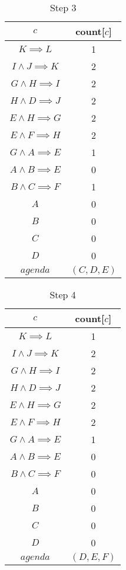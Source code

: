 \documentclass[12pt]{article}
\begin{document}
\begin{itemize}
\begin{table}[H]
\centering
\caption*{Step 3}
\label{my-label1}
\begin{tabular}{ c c }
\hline
$c$ & count[$c$]\\ \hline
$K \implies L$ & 1\\
$I \land J \implies K$ & 2\\
$G \land H \implies I$ & 2\\
$H \land D \implies J$ & 2\\
$E \land H \implies G$ & 2\\
$E \land F \implies H$ & 2\\
$G \land A \implies E$ & 1\\
$A \land B \implies E$ & 0\\
$B \land C \implies F$ & 1\\
$A$ & 0\\
$B$ & 0\\
$C$ & 0\\
$D$ & 0\\ \hline
$agenda$ & $(C, D, E)$
\end{tabular}
\end{table}
		
\begin{table}[H]
\centering
\caption*{Step 4}
\label{my-label1}
\begin{tabular}{ c c }
\hline
$c$ & count[$c$]\\ \hline
$K \implies L$ & 1\\
$I \land J \implies K$ & 2\\
$G \land H \implies I$ & 2\\
$H \land D \implies J$ & 2\\
$E \land H \implies G$ & 2\\
$E \land F \implies H$ & 2\\
$G \land A \implies E$ & 1\\
$A \land B \implies E$ & 0\\
$B \land C \implies F$ & 0\\
$A$ & 0\\
$B$ & 0\\
$C$ & 0\\
$D$ & 0\\ \hline
$agenda$ & $(D, E, F)$
\end{tabular}
\end{table}
		

\end{itemize}
\end{document}
